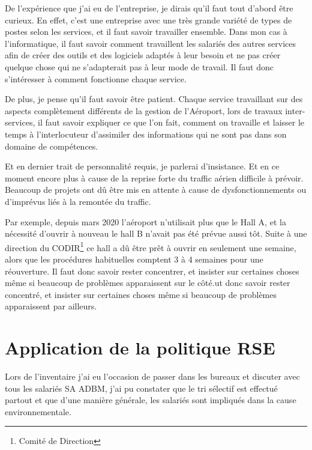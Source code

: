 De l'expérience que j'ai eu de l'entreprise, je dirais qu'il faut tout d'abord être curieux. En effet, c'est une entreprise avec une très grande variété de types de postes selon les services, et il faut savoir travailler ensemble.
Dans mon cas à l'informatique, il faut savoir comment travaillent les salariés des autres services afin de créer des outils et des logiciels adaptés à leur besoin et ne pas créer quelque chose qui ne s'adapterait pas à leur mode de travail.
Il faut donc s'intéresser à comment fonctionne chaque service.\newline

De plus, je pense qu'il faut savoir être patient. Chaque service travaillant sur des aspects complètement différents de la gestion de l'Aéroport, lors de travaux inter-services, il faut savoir expliquer ce que l'on fait, comment on travaille et laisser le temps à l'interlocuteur d'assimiler des informations qui ne sont pas dans son domaine de compétences.\newline

Et en dernier trait de personnalité requis, je parlerai d’insistance. Et en ce moment encore plus à cause de la reprise forte du traffic aérien difficile à prévoir. Beaucoup de projets ont dû être mis en attente à cause de dysfonctionnements ou d’imprévus liés à la remontée du traffic.

Par exemple, depuis mars 2020 l’aéroport n’utilisait plus que le Hall A, et la nécessité d’ouvrir à nouveau le hall B n’avait pas été prévue aussi tôt. Suite à une direction du CODIR\footnote{Comité de Direction} ce hall a dû être prêt à ouvrir en seulement une semaine, alors que les procédures habituelles comptent 3 à 4 semaines pour une réouverture. Il faut donc savoir rester concentrer, et insister sur certaines choses même si beaucoup de problèmes apparaissent sur le côté.ut donc savoir rester concentré, et insister sur certaines choses même si beaucoup de problèmes apparaissent par ailleurs.

\section{Application de la politique RSE}

Lors de l'inventaire j'ai eu l'occasion de passer dans les bureaux et discuter avec tous les salariés SA ADBM, j'ai pu constater que le tri sélectif est effectué partout et que d'une manière générale, les salariés sont impliqués dans la cause environnementale.\newline

